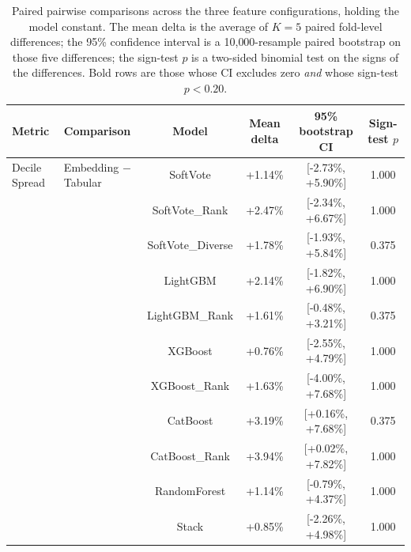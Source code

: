 \documentclass[10pt,journal,compsoc]{IEEEtran}
\begin{document}
\begin{table}[tbp]
\centering
\caption{Paired pairwise comparisons across the three feature configurations, holding the model constant. The mean delta is the average of $K=5$ paired fold-level differences; the 95\% confidence interval is a 10{{,}}000-resample paired bootstrap on those five differences; the sign-test $p$ is a two-sided binomial test on the signs of the differences. Bold rows are those whose CI excludes zero \emph{and} whose sign-test $p<0.20$.}
\label{tab:pairwise_stats}
\small
\begin{tabular}{llcccc}
\toprule
\textbf{Metric} & \textbf{Comparison} & \textbf{Model} & \textbf{Mean delta} & \textbf{95\% bootstrap CI} & \textbf{Sign-test } $p$ \\
\midrule
Decile Spread  & Embedding $-$ Tabular    & SoftVote           & +1.14\%                & [-2.73\%, +5.90\%]               & 1.000      \\
               &                          & SoftVote\_Rank     & +2.47\%                & [-2.34\%, +6.67\%]               & 1.000      \\
               &                          & SoftVote\_Diverse  & +1.78\%                & [-1.93\%, +5.84\%]               & 0.375      \\
               &                          & LightGBM           & +2.14\%                & [-1.82\%, +6.90\%]               & 1.000      \\
               &                          & LightGBM\_Rank     & +1.61\%                & [-0.48\%, +3.21\%]               & 0.375      \\
               &                          & XGBoost            & +0.76\%                & [-2.55\%, +4.79\%]               & 1.000      \\
               &                          & XGBoost\_Rank      & +1.63\%                & [-4.00\%, +7.68\%]               & 1.000      \\
               &                          & CatBoost           & +3.19\%                & [+0.16\%, +7.68\%]               & 0.375      \\
               &                          & CatBoost\_Rank     & +3.94\%                & [+0.02\%, +7.82\%]               & 1.000      \\
               &                          & RandomForest       & +1.14\%                & [-0.79\%, +4.37\%]               & 1.000      \\
               &                          & Stack              & +0.85\%                & [-2.26\%, +4.98\%]               & 1.000      \\

\end{tabular}
\end{table}
\end{document}
